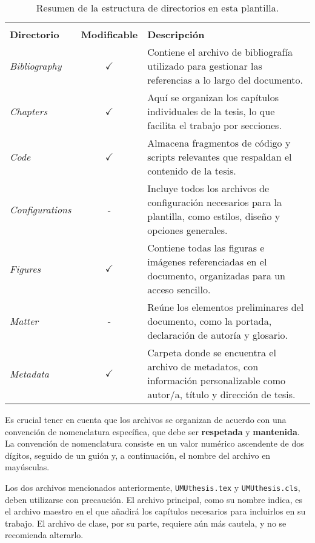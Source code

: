 \begin{table}[!htpb]
    \setlength{\extrarowheight}{2pt}
    \caption[Estructura de directorios y organización de archivos]{Resumen de la estructura de directorios en esta plantilla.}
    \label{tab:file-structure}
    \begin{tabularx}{\textwidth}{lcX}
        \toprule
        \\[-1.5\normalbaselineskip]
        \textbf{Directorio} & \textbf{Modificable} & \textbf{Descripción} \\ [0em]
        \midrule
        \textit{Bibliography} & $\checkmark$ & Contiene el archivo de bibliografía utilizado para gestionar las referencias a lo largo del documento. \\
        \textit{Chapters} & $\checkmark$ & Aquí se organizan los capítulos individuales de la tesis, lo que facilita el trabajo por secciones. \\
        \textit{Code} & $\checkmark$ & Almacena fragmentos de código y scripts relevantes que respaldan el contenido de la tesis. \\
        \textit{Configurations} & - & Incluye todos los archivos de configuración necesarios para la plantilla, como estilos, diseño y opciones generales. \\
        \textit{Figures} & $\checkmark$ & Contiene todas las figuras e imágenes referenciadas en el documento, organizadas para un acceso sencillo. \\
        \textit{Matter} & - & Reúne los elementos preliminares del documento, como la portada, declaración de autoría y glosario. \\
        \textit{Metadata} & $\checkmark$ & Carpeta donde se encuentra el archivo de metadatos, con información personalizable como autor/a, título y dirección de tesis. \\
        \bottomrule
    \end{tabularx}
\end{table}


Es crucial tener en cuenta que los archivos se organizan de acuerdo con una convención de nomenclatura específica, que debe ser \textbf{respetada} y \textbf{mantenida}. La convención de nomenclatura consiste en un valor numérico ascendente de dos dígitos, seguido de un guión y, a continuación, el nombre del archivo en mayúsculas. 

Los dos archivos mencionados anteriormente, \texttt{UMUthesis.tex} y \texttt{UMUthesis.cls}, deben utilizarse con precaución. El archivo principal, como su nombre indica, es el archivo maestro en el que añadirá los capítulos necesarios para incluirlos en su trabajo. El archivo de clase, por su parte, requiere aún más cautela, y no se recomienda alterarlo.

